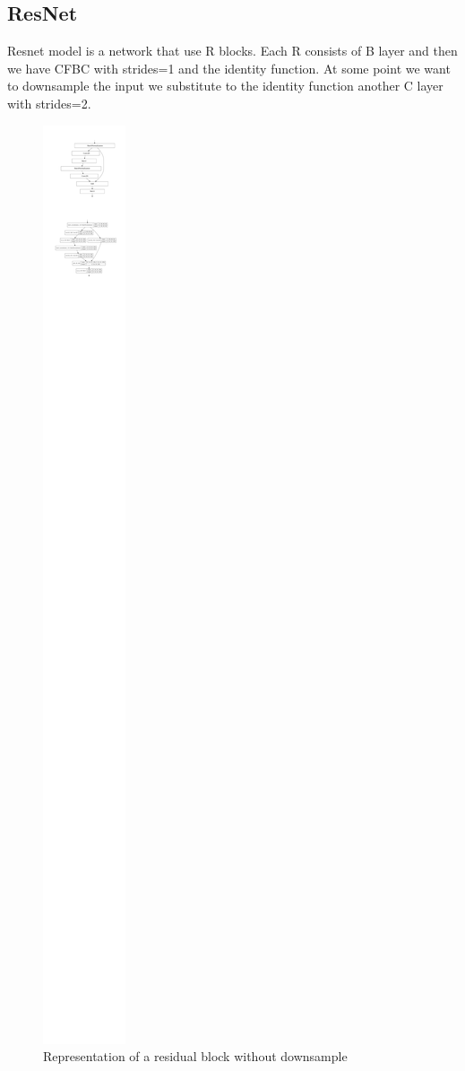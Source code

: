 \documentclass[10pt,twocolumn,letterpaper]{article}
\begin{document}
\subsection*{ResNet}
Resnet model is a network that use R blocks. 
Each R consists of B layer and then we have CFBC with strides=1 and the identity function. 
At some point we want to downsample the input we substitute to the identity function another 
C layer with strides=2.
\begin{figure}[H]
   \centering
   \includegraphics[width=0.7\linewidth]{./immagini/residual_block.pdf}
   \caption{Representation of a residual block without downsample}
\end{figure}
\end{document}
